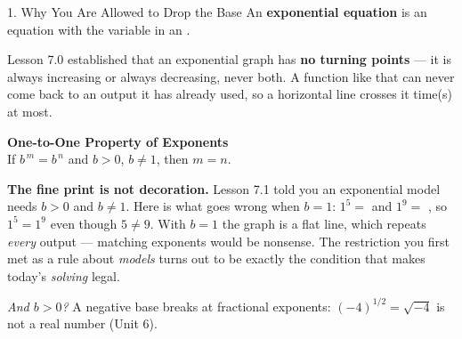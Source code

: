 \documentclass[10pt]{article}
\begin{document}
\begin{notesbox}{1. Why You Are Allowed to Drop the Base}
An \textbf{exponential equation} is an equation with the variable in an .

\vspace{4pt}
Lesson 7.0 established that an exponential graph has \textbf{no turning points} --- it is always
increasing or always decreasing, never both. A function like that can never come back to an output it
has already used, so a horizontal line crosses it  time(s) at most.

\vspace{4pt}
\begin{center}
\begin{tcolorbox}[colback=goldbg, colframe=goldacc, boxrule=0.8pt, arc=1.5mm, width=0.90\linewidth,
    left=3mm, right=3mm, top=2mm, bottom=2mm]
\centering
\textbf{One-to-One Property of Exponents} \\[3pt]
If \; $b^{\,m} = b^{\,n}$ \; and \; $b>0$, $b\neq1$, \qquad then \; $m=n$.
\end{tcolorbox}
\end{center}

\vspace{2pt}
\textbf{The fine print is not decoration.} Lesson 7.1 told you an exponential model needs $b>0$ and
$b\neq1$. Here is what goes wrong when $b=1$: \; $1^{5}=$  \; and \; $1^{9}=$
, \; so $1^{5}=1^{9}$ even though $5\neq9$. With $b=1$ the graph is a flat line, which
repeats \emph{every} output --- matching exponents would be nonsense. The restriction you first met as
a rule about \emph{models} turns out to be exactly the condition that makes today's \emph{solving}
legal.

\vspace{3pt}
\emph{And $b>0$?} A negative base breaks at fractional exponents: $(-4)^{1/2}=\sqrt{-4}$ is not a real
number (Unit 6).
\end{notesbox}
\end{document}
